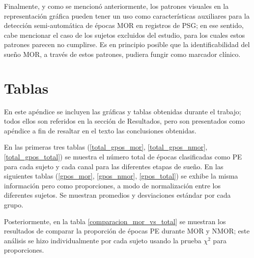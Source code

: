 \documentclass[12pt,a4paper]{mitthesis}
\begin{document}
Finalmente, y como se mencion\'o anteriormente, los patrones visuales en la representaci\'on 
gr\'afica pueden tener un uso como caracter\'isticas auxiliares para la detecci\'on 
semi-autom\'atica de \'epocas MOR en registros de PSG; en ese sentido, cabe mencionar el caso de 
los sujetos excluidos del estudio, para los cuales estos patrones parecen no cumplirse. 
Es en principio posible que la identificabilidad del sue\~no MOR, a trav\'es de estos patrones, 
pudiera fungir como marcador cl\'inico.


\appendix

\chapter{Tablas}

En este ap\'endice se incluyen las gr\'aficas y tablas obtenidas durante el trabajo; todos ellos 
son referidos en la secci\'on de Resultados, pero son presentados como ap\'endice a fin de resaltar 
en el texto las conclusiones obtenidas.

En las primeras tres tablas (\ref{total_gpos_mor}, \ref{total_gpos_nmor}, \ref{total_gpos_total}) 
se muestra el n\'umero total de \'epocas clasificadas como PE para cada sujeto y cada canal para 
las diferentes etapas de sue\~no. En las siguientes tablas (\ref{gpos_mor}, \ref{gpos_nmor}, 
\ref{gpos_total}) se exhibe la misma informaci\'on pero como proporciones, a modo de 
normalizaci\'on entre los diferentes sujetos. Se muestran promedios y desviaciones est\'andar por 
cada grupo.

Posteriormente, en la tabla \ref{comparacion_mor_vs_total} se muestran los resultados de comparar 
la proporci\'on de \'epocas PE durante MOR y NMOR; este an\'alisis se hizo individualmente por cada
sujeto usando la prueba $\chi^{2}$ para proporciones.

\end{document}
